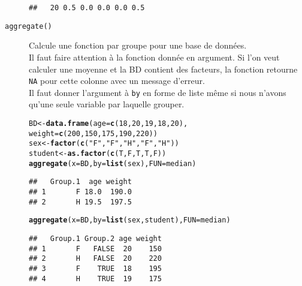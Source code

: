 \documentclass[10pt, french]{article}\usepackage[]{graphicx}\usepackage[]{color}
\makeatletter
\newcommand{\hlnum}[1]{\textcolor[rgb]{0.686,0.059,0.569}{#1}}%
\newcommand{\hlstr}[1]{\textcolor[rgb]{0.192,0.494,0.8}{#1}}%
\newcommand{\hlstd}[1]{\textcolor[rgb]{0.345,0.345,0.345}{#1}}%
\newcommand{\hlkwb}[1]{\textcolor[rgb]{0.69,0.353,0.396}{#1}}%
\newcommand{\hlkwc}[1]{\textcolor[rgb]{0.333,0.667,0.333}{#1}}%
\newcommand{\hlkwd}[1]{\textcolor[rgb]{0.737,0.353,0.396}{\textbf{#1}}}%
\newenvironment{kframe}{%
 \def\at@end@of@kframe{}%
 \ifinner\ifhmode%
  \def\at@end@of@kframe{\end{minipage}}%
  \begin{minipage}{\columnwidth}%
 \fi\fi%
 \def\FrameCommand##1{\hskip\@totalleftmargin \hskip-\fboxsep
 \colorbox{shadecolor}{##1}\hskip-\fboxsep
     \hskip-\linewidth \hskip-\@totalleftmargin \hskip\columnwidth}%
 \MakeFramed {\advance\hsize-\width
   \@totalleftmargin\z@ \linewidth\hsize
   \@setminipage}}%
 {\par\unskip\endMakeFramed%
 \at@end@of@kframe}
\newenvironment{knitrout}{}{} %
\makeatother
\begin{document}
\begin{description}
\begin{knitrout}
\begin{kframe}
\begin{verbatim}
##   20 0.5 0.0 0.0 0.0 0.5
\end{verbatim}
\end{kframe}
\end{knitrout}
	\item[\texttt{aggregate()}]	Calcule une fonction par groupe pour une base de données.\\
		Il faut faire attention à la fonction donnée en argument. Si l’on veut calculer une moyenne et la BD contient des facteurs, la fonction retourne \texttt{NA} pour cette colonne avec un message d'erreur.\\
		Il faut donner l'argument à \texttt{by} en forme de liste même si nous n'avons qu'une seule variable par laquelle grouper.
\begin{knitrout}
\color{fgcolor}\begin{kframe}
\begin{alltt}
\hlstd{BD} \hlkwb{<-} \hlkwd{data.frame}\hlstd{(}\hlkwc{age} \hlstd{=} \hlkwd{c}\hlstd{(}\hlnum{18}\hlstd{,} \hlnum{20}\hlstd{,} \hlnum{19}\hlstd{,} \hlnum{18}\hlstd{,} \hlnum{20}\hlstd{),}
                 \hlkwc{weight} \hlstd{=} \hlkwd{c}\hlstd{(}\hlnum{200}\hlstd{,} \hlnum{150}\hlstd{,} \hlnum{175}\hlstd{,} \hlnum{190}\hlstd{,} \hlnum{220}\hlstd{))}
\hlstd{sex} \hlkwb{<-} \hlkwd{factor}\hlstd{(}\hlkwd{c}\hlstd{(}\hlstr{"F"}\hlstd{,} \hlstr{"F"}\hlstd{,} \hlstr{"H"}\hlstd{,} \hlstr{"F"}\hlstd{,} \hlstr{"H"}\hlstd{))}
\hlstd{student} \hlkwb{<-} \hlkwd{as.factor}\hlstd{(}\hlkwd{c}\hlstd{(T, F, T, T, F))}
\hlkwd{aggregate}\hlstd{(}\hlkwc{x} \hlstd{= BD,} \hlkwc{by} \hlstd{=} \hlkwd{list}\hlstd{(sex),} \hlkwc{FUN} \hlstd{= median)}
\end{alltt}
\begin{verbatim}
##   Group.1  age weight
## 1       F 18.0  190.0
## 2       H 19.5  197.5
\end{verbatim}
\begin{alltt}
\hlkwd{aggregate}\hlstd{(}\hlkwc{x} \hlstd{= BD,} \hlkwc{by} \hlstd{=} \hlkwd{list}\hlstd{(sex, student),} \hlkwc{FUN} \hlstd{= median)}
\end{alltt}
\begin{verbatim}
##   Group.1 Group.2 age weight
## 1       F   FALSE  20    150
## 2       H   FALSE  20    220
## 3       F    TRUE  18    195
## 4       H    TRUE  19    175
\end{verbatim}
\end{kframe}
\end{knitrout}
\end{description}
\end{document}
